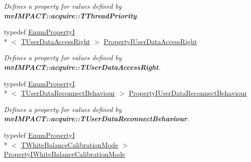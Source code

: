 \begin{DoxyCompactItemize}
\begin{DoxyCompactList}\small\item\em Defines a property for values defined by {\bfseries mv\+I\+M\+P\+A\+C\+T\+::acquire\+::\+T\+Thread\+Priority}. \end{DoxyCompactList}\item 
\hypertarget{group___common_interface_ga047125aae9705dc31db2e88a52f6422e}{typedef \hyperlink{classmv_i_m_p_a_c_t_1_1acquire_1_1_enum_property_i}{Enum\+Property\+I}\\*
$<$ \hyperlink{group___common_interface_gabda8d2f2e8458c2edb94503478dbcbfa}{T\+User\+Data\+Access\+Right} $>$ \hyperlink{group___common_interface_ga047125aae9705dc31db2e88a52f6422e}{Property\+I\+User\+Data\+Access\+Right}}\label{group___common_interface_ga047125aae9705dc31db2e88a52f6422e}

\begin{DoxyCompactList}\small\item\em Defines a property for values defined by {\bfseries mv\+I\+M\+P\+A\+C\+T\+::acquire\+::\+T\+User\+Data\+Access\+Right}. \end{DoxyCompactList}\item 
\hypertarget{group___common_interface_ga26a11fd50037db50142ec603904bcb8d}{typedef \hyperlink{classmv_i_m_p_a_c_t_1_1acquire_1_1_enum_property_i}{Enum\+Property\+I}\\*
$<$ \hyperlink{group___common_interface_ga75776c64a8383014d608b9845708aee2}{T\+User\+Data\+Reconnect\+Behaviour} $>$ \hyperlink{group___common_interface_ga26a11fd50037db50142ec603904bcb8d}{Property\+I\+User\+Data\+Reconnect\+Behaviour}}\label{group___common_interface_ga26a11fd50037db50142ec603904bcb8d}

\begin{DoxyCompactList}\small\item\em Defines a property for values defined by {\bfseries mv\+I\+M\+P\+A\+C\+T\+::acquire\+::\+T\+User\+Data\+Reconnect\+Behaviour}. \end{DoxyCompactList}\item 
\hypertarget{group___common_interface_gab129f1b9a01f41a701fd35fd1fddc4d2}{typedef \hyperlink{classmv_i_m_p_a_c_t_1_1acquire_1_1_enum_property_i}{Enum\+Property\+I}\\*
$<$ \hyperlink{group___common_interface_ga7218069510c56114414c935faf5bfd09}{T\+White\+Balance\+Calibration\+Mode} $>$ \hyperlink{group___common_interface_gab129f1b9a01f41a701fd35fd1fddc4d2}{Property\+I\+White\+Balance\+Calibration\+Mode}}\label{group___common_interface_gab129f1b9a01f41a701fd35fd1fddc4d2}


\end{DoxyCompactItemize}
